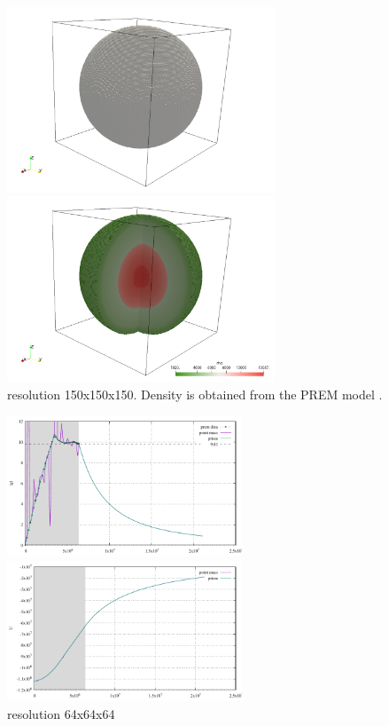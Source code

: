 \begin{center}
\includegraphics[width=8cm]{python_codes/fieldstone_84/earth/setup}
\includegraphics[width=8cm]{python_codes/fieldstone_84/earth/rho}\\
{\captionfont resolution 150x150x150. Density is obtained from the PREM model \cite{dzan81}.}
\end{center}


\begin{center}
\includegraphics[width=7cm]{python_codes/fieldstone_84/earth/gravnorm}
\includegraphics[width=7cm]{python_codes/fieldstone_84/earth/gravpot}\\
{\captionfont resolution 64x64x64}
\end{center}

